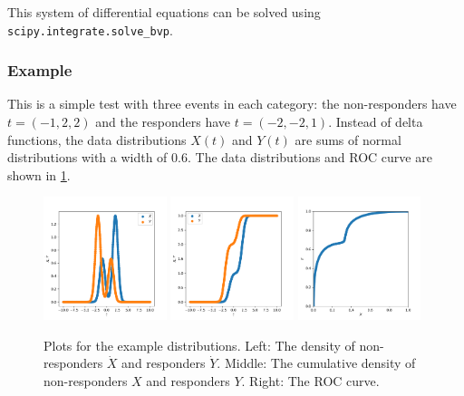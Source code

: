 \documentclass[11pt]{article}
\newcommand{\Xdot}{\dot{X}}
\newcommand{\Ydot}{\dot{Y}}
\begin{document}
This system of differential equations can be solved using \texttt{scipy.integrate.solve\_bvp}.

\subsubsection{Example}

This is a simple test with three events in each category: the non-responders have \(t=\left(-1, 2, 2\right)\) and the responders have \(t=\left(-2, -2, 1\right)\).  Instead of delta functions, the data distributions \(X(t)\) and \(Y(t)\) are sums of normal distributions with a width of \(0.6\).  The data distributions and ROC curve are shown in \cref{fig:exampledata}.

\begin{figure}
\begin{center}
\includegraphics[width=0.32\textwidth]{exampleXdotYdot.pdf}
\includegraphics[width=0.32\textwidth]{exampleXY.pdf}
\includegraphics[width=0.32\textwidth]{exampleroc.pdf}
\caption{Plots for the example distributions.  Left: The density of non-responders \(\Xdot\) and responders \(\Ydot\).  Middle: The cumulative density of non-responders \(X\) and responders \(Y\).  Right: The ROC curve.}
\label{fig:exampledata}
\end{center}
\end{figure}
\end{document}
